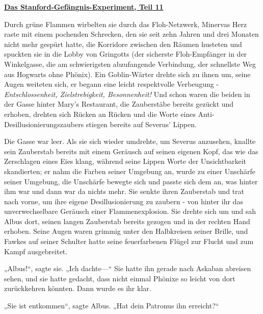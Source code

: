 

\hypertarget{das-stanford-gefuxe4ngnis-experiment-teil-11}{%

\textbf{\uline{Das Stanford-Gefängnis-Experiment, Teil 11}}

Durch grüne Flammen wirbelten sie durch das Floh-Netzwerk, Minervas Herz raste mit einem pochenden Schrecken, den sie seit zehn Jahren und drei Monaten nicht mehr gespürt hatte, die Korridore zwischen den Räumen husteten und spuckten sie in die Lobby von Gringotts (der sicherste Floh-Empfänger in der Winkelgasse, die am schwierigsten abzufangende Verbindung, der schnellste Weg aus Hogwarts ohne Phönix). Ein Goblin-Wärter drehte sich zu ihnen um, seine Augen weiteten sich, er begann eine leicht respektvolle Verbeugung - \emph{Entschlossenheit, Zielstrebigkeit, Besonnenheit!} Und schon waren die beiden in der Gasse hinter Mary's Restaurant, die Zauberstäbe bereits gezückt und erhoben, drehten sich Rücken an Rücken und die Worte eines Anti-Desillusionierungszaubers stiegen bereits auf Severus' Lippen.

Die Gasse war leer. Als sie sich wieder umdrehte, um Severus anzusehen, knallte sein Zauberstab bereits mit einem Geräusch auf seinen eigenen Kopf, das wie das Zerschlagen eines Eies klang, während seine Lippen Worte der Unsichtbarkeit skandierten; er nahm die Farben seiner Umgebung an, wurde zu einer Unschärfe seiner Umgebung, die Unschärfe bewegte sich und passte sich dem an, was hinter ihm war und dann war da nichts mehr. Sie senkte ihren Zauberstab und trat nach vorne, um ihre eigene Desillusionierung zu zaubern - von hinter ihr das unverwechselbare Geräusch einer Flammenexplosion. Sie drehte sich um und sah Albus dort, seinen langen Zauberstab bereits gezogen und in der rechten Hand erhoben. Seine Augen waren grimmig unter den Halbkreisen seiner Brille, und Fawkes auf seiner Schulter hatte seine feuerfarbenen Flügel zur Flucht und zum Kampf ausgebreitet.

„Albus!“, sagte sie. „Ich dachte—“ Sie hatte ihn gerade nach Askaban abreisen sehen, und sie hatte gedacht, dass nicht einmal Phönixe so leicht von dort zurückkehren könnten. Dann wurde es ihr klar.

„Sie ist entkommen“, sagte Albus. „Hat dein Patronus ihn erreicht?“

}
